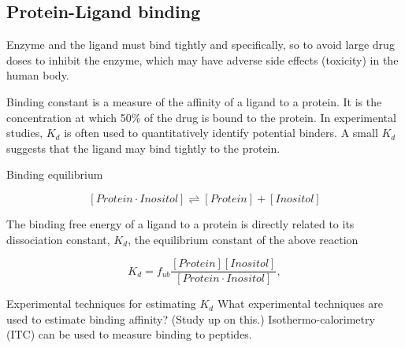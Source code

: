 \subsection{Protein-Ligand binding}
\begin{outline}
	\1 Enzyme and the ligand must bind tightly and specifically, so to avoid large drug doses to inhibit the enzyme, which may have adverse side effects (toxicity) in the human body.

	\1 Binding constant is a measure of the affinity of a ligand to a protein. It is the concentration at which 50\% of the drug is bound to the protein. In experimental studies, $K_d$ is often used to quantitatively identify potential binders. A small $K_d$ suggests that the ligand may bind tightly to the protein.

	\1 Binding equilibrium

    \begin{equation}
      \left[ Protein\cdot Inositol \right] 
      \rightleftharpoons 
      \left[ Protein \right]+\left[ Inositol \right]
    \end{equation}
  
    
	\1 The binding free energy of a ligand to a protein is directly related to its dissociation constant, $K_d$, the equilibrium constant of the above reaction

     \begin{equation}
        K_{d} = f_{ub}\frac{\left[ Protein \right]\left[ Inositol \right]}{\left[Protein \cdot Inositol\right]},
     \end{equation}
     
	\1 Experimental techniques for estimating $K_d$
		\2 What experimental techniques are used to estimate binding affinity? (Study up on this.)
		\2 Isothermo-calorimetry (ITC) can be used to measure binding to peptides.
\end{outline}	


